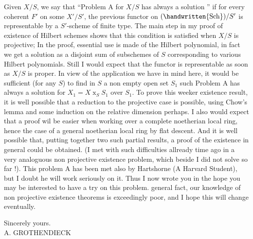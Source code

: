 Given $X/S$, we say that ``Problem A for $X/S$ has always a solution '' if for every coherent $F'$ on some $X'/S'$, the previous functor on $(\handwritten{\mathrm{Sch}})/S'$ is representable by a $S'$-scheme of finite type. The main step in my proof of existence of Hilbert schemes shows that this condition is satisfied when $X/S$ is projective; In the proof, essential use is made of the Hilbert polynomial, in fact we get a solution as a disjoint sum of subschemes of $S$ corresponding to various Hilbert polynomials. Still I would expect that the functor is representable as soon as $X/S$ is proper. In view of the application we have in mind here, it would be sufficient (for any  $S$) to find in $S$ a non empty open set $S_{1}$ such Problem A has always a solution for $X_{1}=X\mathbin{x}_{S}S_{1}$ over $S_{1}$. To prove this weeker existence result, it is well possible that a reduction to the projective case is possible, using Chow's lemma and some induction on the relative dimension perhaps. I also would expect that a proof wil be easier when working over a complete noetherian local ring, hence the case of a general noetherian local ring by flat descent. And it is well possible that, putting together two such partial results, a proof of the existence in general could be obtained. (I met with such difficulties allready time ago in a very analoguous non projective existence problem, which beside I did not solve so far !). This problem A has been met also by Hartshorne (A Harvard Student), but I doubt he will work seriously on it. Thus I now wrote you in the hope you may be interested to have a try on this problem.  general fact, our knowledge of non projective existence theorems is exceedingly poor, and I hope this will change eventually.

Sincerely yours.\\

A. GROTHENDIECK\\

